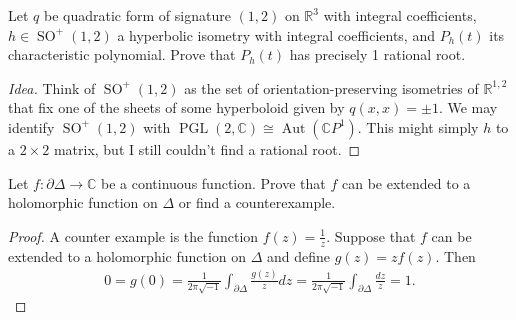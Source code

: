 \documentclass{article}
\numberwithin{equation}{section}
\newcommand{\R}{\mathbb{R}}
\newcommand{\C}{\mathbb{C}}
\DeclareMathOperator{\SO}{SO}
\DeclareMathOperator{\Aut}{Aut}
\DeclareMathOperator{\PGL}{PGL}
\begin{document}
	\begin{exercise}
		Let $q$ be quadratic form of signature $(1,2)$ on $\R^3$ with integral coefficients, $h\in\SO^+(1,2)$ a hyperbolic isometry with integral coefficients, and $P_h(t)$ its characteristic polynomial. Prove that $P_h(t)$ has precisely 1 rational root.
	\end{exercise}
	\begin{proof}[Idea]
		Think of $\SO^+(1,2)$ as the set of orientation-preserving isometries of $\R^{1,2}$ that fix one of the sheets of some hyperboloid given by $q(x,x)=\pm1$. We may identify $\SO^+(1,2)$ with $\PGL(2,\C)\cong\Aut(\C P^1)$. {\color{magenta} This might simply $h$ to a $2\times 2$ matrix, but I still couldn't find a rational root.}
	\end{proof}
	\begin{exercise}
		Let $f:\partial\Delta\to\C$ be a continuous function. Prove that $f$ can be extended to a holomorphic function on $\Delta$ or find a counterexample.
	\end{exercise}
	\begin{proof}
		A counter example is the function $f(z)=\frac{1}{z}$. Suppose that $f$ can be extended to a holomorphic function on $\Delta$ and define $g(z)=zf(z)$. Then
		\begin{align*}
			0=g(0)=\frac{1}{2\pi\sqrt{-1}}\int_{\partial\Delta}\frac{g(z)}{z}dz=\frac{1}{2\pi \sqrt{-1}}\int_{\partial\Delta}\frac{dz}{z}=1.
		\end{align*}
		
	\end{proof}
	
	
\end{document}
